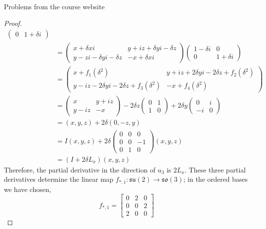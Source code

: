 \documentclass[12pt]{article}
\theoremstyle{definition}
\begin{document}
\begin{section}{Problems from the course website}
\begin{proof}
\begin{align*}
\begin{pmatrix}
		0 & 1 + \delta i
	\end{pmatrix}\\
	&= \begin{pmatrix}
		x + \delta x i & y + iz + \delta y i - \delta z\\
		y - zi - \delta y i - \delta z & -x + \delta x i 
	\end{pmatrix}\begin{pmatrix}
		1 - \delta i & 0 \\ 0 & 1 + \delta i
	\end{pmatrix}\\
	&= \begin{pmatrix}
		x + f_1(\delta^2) & y + iz + 2 \delta y i - 2 \delta z + f_2(\delta^2)\\
		y - iz - 2 \delta y i - 2 \delta z   + f_3(\delta^2)& -x + f_4(\delta^2)
	\end{pmatrix}\\
	&= \begin{pmatrix}
		x & y + iz\\
		y - iz & -x
	\end{pmatrix} - 2\delta z\begin{pmatrix}
		0 & 1\\
		1 & 0
	\end{pmatrix} + 2\delta y \begin{pmatrix}
		0 & i\\
		-i & 0
	\end{pmatrix}\\
	&= (x,y,z) + 2\delta(0,-z,y)\\
	&= I(x,y,z) + 2\delta \begin{pmatrix}
		0 & 0 & 0\\ 
		0 & 0 & -1\\
	0 & 1 & 0
\end{pmatrix}(x,y,z)\\
&= (I + 2\delta L_x)(x,y,z)
\end{align*}
Therefore, the partial derivative in the direction of $u_3$ is $2L_x$. These three partial derivatives determine the linear map $f_{*,1} : \mathfrak{su}(2) \to \mathfrak{so}(3)$; in the ordered bases we have chosen, 
\[f_{*,1} = \begin{bmatrix}
	0 & 2 & 0\\
	0 & 0 & 2\\
	2 & 0 & 0
\end{bmatrix}\]
\end{proof}
\end{section}
\begin{thebibliography}{}
\end{thebibliography}
\end{document}
